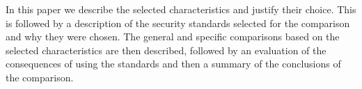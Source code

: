     In this paper we describe the selected characteristics and justify their
    choice. This is followed by a description of the security standards selected
    for the comparison and why they were chosen. The general and specific
    comparisons based on the selected characteristics are then described,
    followed by an evaluation of the consequences of using the standards and
    then a summary of the conclusions of the comparison.


